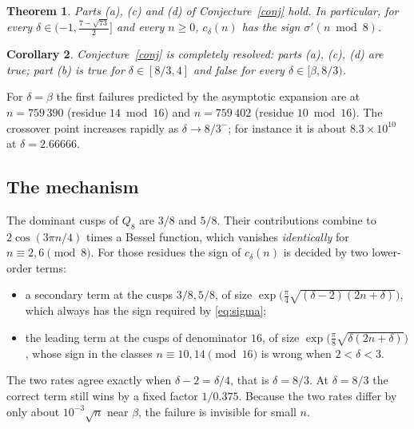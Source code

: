 \documentclass[11pt]{amsart}
\newtheorem{theorem}{Theorem}[section]
\newtheorem{corollary}[theorem]{Corollary}
\theoremstyle{remark}
\theoremstyle{definition}
\begin{document}
\begin{theorem}\label{thm:C}
Parts (a), (c) and (d) of Conjecture~\ref{conj} hold. In particular, for every $\delta\in(-1,\frac{7-\sqrt{73}}2]$ and every $n\ge0$, $c_\delta(n)$ has the sign $\sigma'(n\bmod8)$.
\end{theorem}

\begin{corollary}
Conjecture~\ref{conj} is completely resolved: parts (a), (c), (d) are true; part (b) is true for $\delta\in[8/3,4]$ and false for every $\delta\in[\beta,8/3)$.
\end{corollary}

For $\delta=\beta$ the first failures predicted by the asymptotic expansion are at $n=759\,390$ (residue $14\bmod16$) and $n=759\,402$ (residue $10\bmod16$). The crossover point increases rapidly as $\delta\to8/3^-$; for instance it is about $8.3\times10^{10}$ at $\delta=2.66666$.

\subsection*{The mechanism}
The dominant cusps of $Q_8$ are $3/8$ and $5/8$. Their contributions combine to $2\cos(3\pi n/4)$ times a Bessel function, which vanishes \emph{identically} for $n\equiv2,6\pmod 8$. For those residues the sign of $c_\delta(n)$ is decided by two lower-order terms:
\begin{itemize}[leftmargin=2em]
\item a secondary term at the cusps $3/8,5/8$, of size $\exp\big(\tfrac\pi4\sqrt{(\delta-2)(2n+\delta)}\big)$, which always has the sign required by \eqref{eq:sigma};
\item the leading term at the cusps of denominator $16$, of size $\exp\big(\tfrac\pi8\sqrt{\delta(2n+\delta)}\big)$, whose sign in the classes $n\equiv10,14\pmod{16}$ is wrong when $2<\delta<3$.
\end{itemize}
The two rates agree exactly when $\delta-2=\delta/4$, that is $\delta=8/3$. At $\delta=8/3$ the correct term still wins by a fixed factor $1/0.375$. Because the two rates differ by only about $10^{-3}\sqrt n$ near $\beta$, the failure is invisible for small $n$.
\end{document}
